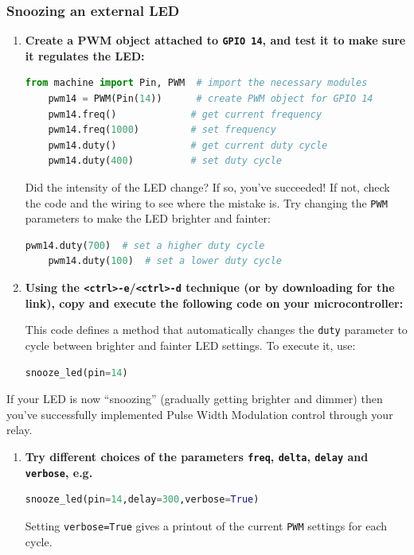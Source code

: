 \subsubsection{\howto Snoozing an external LED}
\begin{enumerate}
	\item \textbf{Create a PWM object attached to \texttt{GPIO 14}, and test it to make sure it regulates the LED:}
	\begin{lstlisting}[language=Python]
	from machine import Pin, PWM  # import the necessary modules
	pwm14 = PWM(Pin(14))      # create PWM object for GPIO 14
	pwm14.freq()             # get current frequency
	pwm14.freq(1000)         # set frequency
	pwm14.duty()             # get current duty cycle
	pwm14.duty(400)          # set duty cycle
	\end{lstlisting}
	Did the intensity of the LED change? 
	If so, you've succeeded!
	If not, check the code and the wiring to see where the mistake is.
	\smallskip
	Try changing the \texttt{PWM} parameters to make the LED brighter and fainter: 
	\begin{lstlisting}[language=Python]
	pwm14.duty(700)  # set a higher duty cycle
	pwm14.duty(100)  # set a lower duty cycle
	\end{lstlisting}
	\item \textbf{Using the \texttt{<ctrl>-e}/\texttt{<ctrl>-d} technique (or by downloading for the link), copy and execute the following code on your microcontroller:}
	
	
	This code defines a method that automatically changes the \texttt{duty} parameter to cycle between brighter and fainter LED settings. 
	To execute it, use:
	\begin{lstlisting}[language=Python]
	snooze_led(pin=14)
	\end{lstlisting}
\end{enumerate}
If your LED is now “snoozing” (gradually getting brighter and dimmer) then you’ve successfully implemented Pulse Width Modulation control through your relay.
\begin{enumerate}[resume]
	\item \textbf{Try different choices of the parameters \texttt{freq}, \texttt{delta}, \texttt{delay} and \texttt{verbose}, e.g.} 
	\begin{lstlisting}[language=Python]
	snooze_led(pin=14,delay=300,verbose=True)
	\end{lstlisting}
	Setting \lstinline{verbose=True} gives a printout of the current \texttt{PWM} settings for each cycle.
\end{enumerate}

